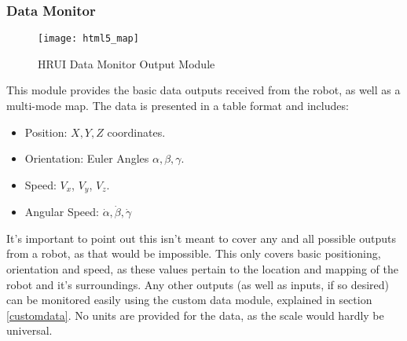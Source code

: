 \subsubsection{Data Monitor} \label{datamonitor}
\begin{figure}[H]
\centering
\captionsetup{justification=centering}
\texttt{[image: html5\_map]}
\caption{HRUI Data Monitor Output Module}
\end{figure}
This module provides the basic data outputs received from the robot, as well as a multi-mode map. The data is presented in a 
table format and includes:
\begin{itemize}
	\item Position: $X, Y, Z$ coordinates.
	\item Orientation: Euler Angles $\alpha, \beta, \gamma$.
	\item Speed: $V_x$, $V_y$, $V_z$.
	\item Angular Speed: $\dot{\alpha}, \dot{\beta}, \dot{\gamma}$
\end{itemize}
It's important to point out this isn't meant to cover any and all possible outputs from a robot, as that would be impossible. 
This only covers basic positioning, orientation and speed, as these values pertain to the location and mapping of the robot 
and it's surroundings. Any other outputs (as well as inputs, if so desired) can be monitored easily using the custom data 
module, explained in section \ref{customdata}. No units are provided for the data, as the scale would hardly be universal.\\

